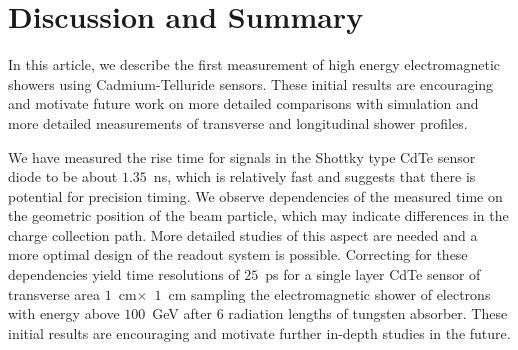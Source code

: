 
\section{Discussion and Summary}
\label{sec:summary} 


In this article, we describe the first measurement of high energy 
electromagnetic showers using Cadmium-Telluride sensors. 
These initial results are encouraging and motivate future work on 
more detailed comparisons with simulation and more detailed 
measurements of transverse and longitudinal shower profiles.



We have measured the rise time for signals in the Shottky type CdTe sensor diode to be about $1.35$~ns, which
is relatively fast and suggests that there is potential for precision timing.
We observe dependencies of the measured time on the geometric position of the
beam particle, which may indicate differences in the charge collection path.
More detailed studies of this aspect are needed and a more optimal design of the 
readout system is possible. Correcting for these dependencies yield time resolutions
of $25$~ps for a single layer CdTe sensor of transverse area $1$~cm$\times$~$1$~cm
sampling the electromagnetic shower of electrons with energy above $100$~GeV 
after $6$ radiation lengths of tungsten absorber. These initial results are encouraging and motivate 
further in-depth studies in the future.



